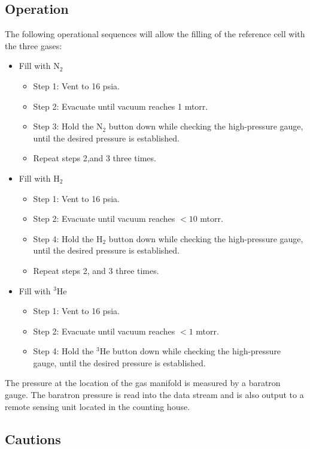 {\subsection{Operation}



The following operational sequences will allow the filling of the reference cell with the three gases:

\begin{itemize}
\item Fill with N$_2$
\begin{itemize}
\item Step 1: Vent to 16 psia.
\item Step 2: Evacuate until vacuum reaches 1 mtorr.
\item Step 3: Hold the N$_2$ button down while checking the high-pressure gauge, until the desired pressure is established.
\item Repeat steps 2,and 3 three times.
\end{itemize}
\item Fill with H$_2$
\begin{itemize}
\item Step 1: Vent to 16 psia.
\item Step 2: Evacuate until vacuum reaches $< 10$ mtorr.
\item Step 4: Hold the H$_2$ button down while checking the high-pressure gauge, until the desired pressure is established.
\item Repeat steps 2, and 3 three times.
\end{itemize}
\item Fill with $^3$He
\begin{itemize}
\item Step 1: Vent to 16 psia.
\item Step 2: Evacuate until vacuum reaches $< 1$ mtorr.
\item Step 4: Hold the $^3$He button down while checking the high-pressure gauge, until the desired pressure is established.
\end{itemize}
\end{itemize}




The pressure at the location of the gas
manifold is measured by a  baratron gauge.  The baratron
pressure is read into the data stream and is also output to a remote
sensing unit located in  the counting house.




\subsection{Cautions}
\label{sec:targ-hel-saf}

}
